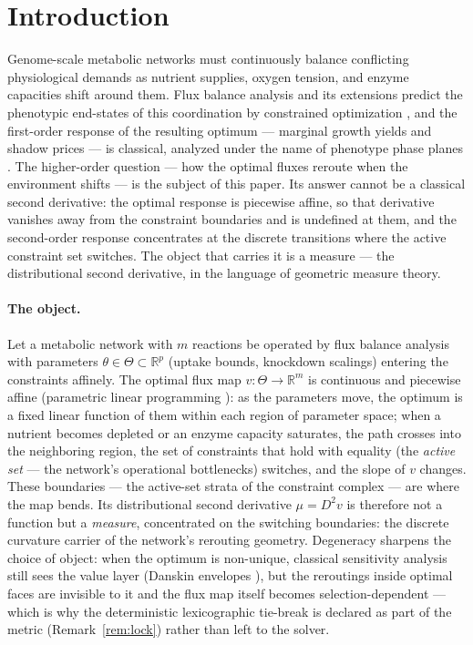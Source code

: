 \documentclass[11pt,a4paper]{article}
\theoremstyle{plain}
\theoremstyle{definition}
\theoremstyle{remark}
\newcommand{\RR}{\mathbb{R}}
\begin{document}
\section{Introduction}\label{sec:intro}

Genome-scale metabolic networks must continuously balance conflicting
physiological demands as nutrient supplies, oxygen tension, and enzyme
capacities shift around them. Flux balance analysis and its extensions
predict the phenotypic end-states of this coordination by constrained
optimization \citep{varma1994, orth2010, lewis2010}, and the
first-order response of the resulting optimum --- marginal growth
yields and shadow prices --- is classical, analyzed under the name of
phenotype phase planes \citep{edwards2001, ibarra2002}. The
higher-order question --- how the optimal fluxes reroute when the
environment shifts --- is the subject of this paper. Its answer
cannot be a classical second derivative: the optimal response is
piecewise affine, so that derivative vanishes away from the
constraint boundaries and is undefined at them, and the second-order
response concentrates at the discrete transitions where the active
constraint set switches. The object that carries it is a measure ---
the distributional second derivative, in the language of geometric
measure theory.

\paragraph{The object.}
Let a metabolic network with $m$ reactions be operated by flux balance
analysis \citep{varma1994, orth2010} with parameters $\theta \in \Theta \subset \RR^p$
(uptake bounds, knockdown scalings) entering the constraints
affinely. The optimal flux map $v : \Theta \to \RR^m$ is continuous
and piecewise affine (parametric linear programming
\citep{borrelli2003}): as the parameters move, the optimum is a fixed
linear function of them within each region of parameter space; when a
nutrient becomes depleted or an enzyme capacity saturates, the path
crosses into the neighboring region, the set of constraints that hold
with equality (the \emph{active set} --- the network's operational
bottlenecks) switches, and the slope of $v$ changes. These
boundaries --- the active-set strata of the constraint complex --- are
where the map bends. Its distributional second derivative
$\mu = D^2 v$ is therefore not a function but a \emph{measure},
concentrated on the switching boundaries: the discrete curvature
carrier of the network's rerouting geometry. Degeneracy sharpens the
choice of object: when the optimum is non-unique, classical
sensitivity analysis still sees the value layer (Danskin envelopes
\citep{danskin1967}), but the reroutings inside optimal faces are
invisible to it and the flux map itself becomes
selection-dependent --- which is why the deterministic lexicographic
tie-break is declared as part of the metric (Remark~\ref{rem:lock})
rather than left to the solver.
\end{document}
